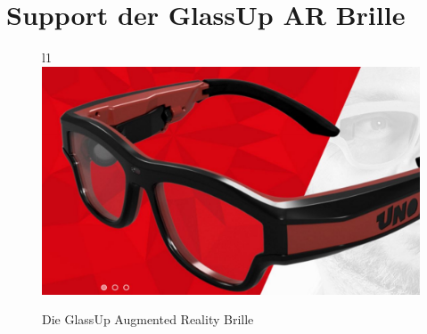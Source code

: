 \section{Support der GlassUp AR Brille}
\begin{figure}{l}{1\linewidth}
	\includegraphics[width=\linewidth]{../images/glassUpGlasses.jpg}
	\caption{Die GlassUp Augmented Reality Brille\cite{home}}
	\label{fig:GlassUpGlasses}
\end{figure}
